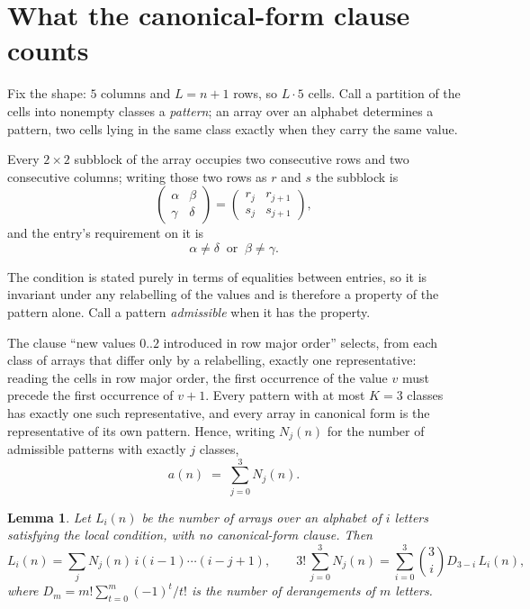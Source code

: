 \documentclass[11pt,a4paper]{article}
\theoremstyle{plain}
\newtheorem{lemma}[theorem]{Lemma}
\theoremstyle{definition}
\begin{document}
\section{What the canonical-form clause counts}

Fix the shape: $5$ columns and $L=n+1$ rows, so $L\cdot5$ cells. Call a
partition of the cells into nonempty classes a \emph{pattern}; an array over an alphabet
determines a pattern, two cells lying in the same class exactly when they carry the same
value.

Every $2\times2$ subblock of the array occupies two consecutive
rows and two consecutive columns; writing those two rows as $r$ and $s$ the
subblock is
\[
\begin{pmatrix}\alpha&\beta\\\gamma&\delta\end{pmatrix}=\begin{pmatrix}r_j&r_{j+1}\\s_j&s_{j+1}\end{pmatrix},
\]
and the entry's requirement on it is
\begin{equation}\label{eq:loc}
\alpha\ne\delta\ \text{ or }\ \beta\ne\gamma.
\end{equation}

The condition is stated purely in terms of equalities between entries, so it is invariant
under any relabelling of the values and is therefore a property of the pattern alone. Call a
pattern \emph{admissible} when it has the property.

The clause ``new values $0..2$ introduced in row major order'' selects, from each class
of arrays that differ only by a relabelling, exactly one representative: reading the cells in
row major order, the first occurrence of the value $v$ must precede the first occurrence of
$v+1$. Every pattern with at most $K=3$ classes has exactly one such representative, and
every array in canonical form is the representative of its own pattern. Hence, writing
$N_j(n)$ for the number of admissible patterns with exactly $j$ classes,
\begin{equation}\label{eq:apat}
a(n)\;=\;\sum_{j=0}^{3}N_j(n).
\end{equation}

\begin{lemma}\label{lem:inv}
Let $L_i(n)$ be the number of arrays over an alphabet of $i$ letters satisfying the local
condition, with no canonical-form clause. Then
\[
L_i(n)=\sum_j N_j(n)\,i(i-1)\cdots(i-j+1),
\qquad
3!\,\sum_{j=0}^{3}N_j(n)=\sum_{i=0}^{3}\binom{3}{i}D_{3-i}\,L_i(n),
\]
where $D_m=m!\sum_{t=0}^{m}(-1)^t/t!$ is the number of derangements of $m$ letters.
\end{lemma}
\end{document}
